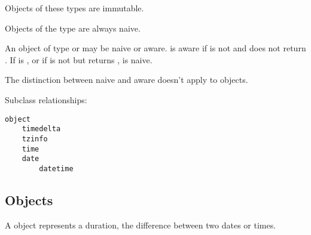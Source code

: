 Objects of these types are immutable.

Objects of the  type are always naive.

An object  of type  or  may be
naive or aware.   is aware if  is not
 and  does not return
.  If  is , or if
 is not  but
 returns , 
is naive.

The distinction between naive and aware doesn't apply to
 objects.

Subclass relationships:

\begin{verbatim}
object
    timedelta
    tzinfo
    time
    date
        datetime
\end{verbatim}

\subsection{ Objects \label{datetime-timedelta}}

A  object represents a duration, the difference
between two dates or times.

